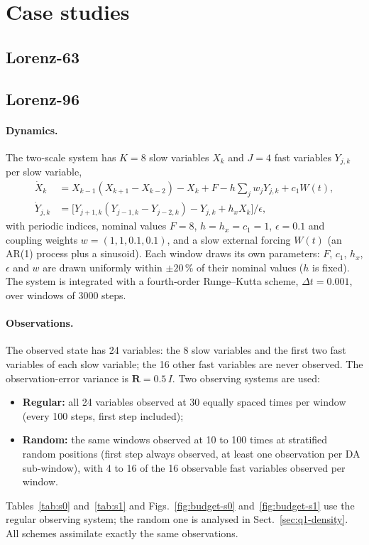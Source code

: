 \appendix

\section{Case studies}\label{app:casestudies}

\subsection{Lorenz-63}

\subsection{Lorenz-96}
\paragraph{Dynamics.}
The two-scale system has $K = 8$ slow variables $X_k$ and $J = 4$ fast variables
$Y_{j,k}$ per slow variable,
\begin{align*}
  \dot X_k &= X_{k-1}(X_{k+1} - X_{k-2}) - X_k + F - h \textstyle\sum_{j} w_j Y_{j,k} + c_1 W(t),\\
  \dot Y_{j,k} &= \big[Y_{j+1,k}(Y_{j-1,k} - Y_{j-2,k}) - Y_{j,k} + h_x X_k\big] / \epsilon ,
\end{align*}
with periodic indices, nominal values $F = 8$, $h = h_x = c_1 = 1$, $\epsilon = 0.1$ and
coupling weights $w = (1, 1, 0.1, 0.1)$, and a slow external forcing $W(t)$ (an AR(1)
process plus a sinusoid). Each window draws its own parameters: $F$, $c_1$, $h_x$,
$\epsilon$ and $w$ are drawn uniformly within $\pm 20\,\%$ of their nominal values
($h$ is fixed).
The system is integrated with a fourth-order Runge--Kutta scheme, $\Delta t = 0.001$,
over windows of 3000 steps.

\paragraph{Observations.}
The observed state has 24 variables: the 8 slow variables and the first two fast
variables of each slow variable; the 16 other fast variables are never observed. The
observation-error variance is $\mathbf{R} = 0.5\,I$. Two observing systems are used:
\begin{itemize}[leftmargin=*,nosep]
  \item \textbf{Regular:} all 24 variables observed at 30 equally spaced times per window
    (every 100 steps, first step included);
  \item \textbf{Random:} the same windows observed at 10 to 100 times at stratified
    random positions (first step always observed, at least one observation per DA
    sub-window), with 4 to 16 of the 16 observable fast variables observed per window.
\end{itemize}
Tables~\ref{tab:s0} and~\ref{tab:s1} and Figs.~\ref{fig:budget-s0}
and~\ref{fig:budget-s1} use the regular observing system; the random one is analysed in
Sect.~\ref{sec:q1-density}. All schemes assimilate exactly the same observations.

